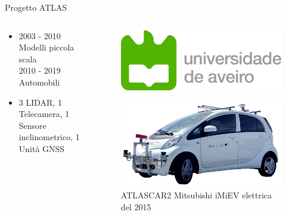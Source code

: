 \documentclass{beamer}
\begin{document}
\begin{frame}{Progetto ATLAS}
\begin{columns}[onlytextwidth,T]
\begin{column}[c]{0.65\textwidth}
\begin{itemize}
			\item 2003 - 2010 Modelli piccola scala\\
			2010 - 2019 Automobili 
			\item 3 LIDAR, 1 Telecamera, 1  Sensore inclinometrico, 1 Unità GNSS
		\end{itemize}
	\end{column}
	\begin{column}[c]{0.33\textwidth}
		\begin{figure}
			\vspace{-3em}
			\centering
			\includegraphics[scale=0.25]{./images/logo_ua.png}
		\end{figure}
		\begin{figure}
			\vspace{-2em}
			\captionsetup{justification=raggedleft}
			\centering
			\includegraphics[scale=0.048]{./images/atlascar2.pdf}
			\caption{ATLASCAR2 Mitsubishi iMiEV elettrica del 2015}
		\end{figure}
	\end{column}			
\end{columns}
	\end{frame}
\end{document}
